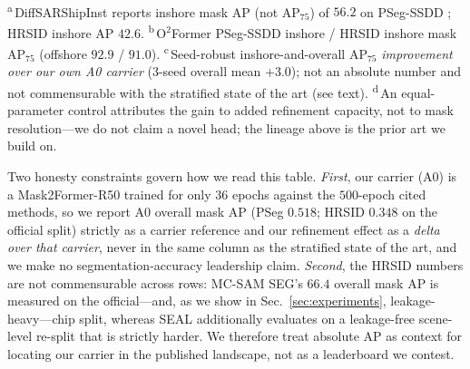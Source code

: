 \begin{table}[t]
\begin{tabular}{@{}llcccc@{}}
\bottomrule
\end{tabular}
\\[2pt]
\raggedright\footnotesize
\textsuperscript{a}\,DiffSARShipInst reports inshore mask AP (not AP$_{75}$) of $56.2$ on PSeg-SSDD \cite{xu2025diffsarshipinst}; HRSID inshore AP $42.6$.
\textsuperscript{b}\,O$^2$Former PSeg-SSDD inshore / HRSID inshore mask AP$_{75}$ \cite{gao2025o2former} (offshore $92.9$ / $91.0$).
\textsuperscript{c}\,Seed-robust inshore-and-overall AP$_{75}$ \emph{improvement over our own A0 carrier} (3-seed overall mean $+3.0$); not an absolute number and not commensurable with the stratified state of the art (see text).
\textsuperscript{d}\,An equal-parameter control attributes the gain to added refinement capacity, not to mask resolution---we do not claim a novel head; the lineage above is the prior art we build on.
\end{table}

Two honesty constraints govern how we read this table. \emph{First}, our carrier (A0) is a Mask2Former-R50 trained for only $36$ epochs against the $500$-epoch cited methods, so we report A0 overall mask AP (PSeg $0.518$; HRSID $0.348$ on the official split) strictly as a carrier reference and our refinement effect as a \emph{delta over that carrier}, never in the same column as the stratified state of the art, and we make no segmentation-accuracy leadership claim. \emph{Second}, the HRSID numbers are not commensurable across rows: MC-SAM SEG's $66.4$ overall mask AP \cite{zheng2024mcsamseg} is measured on the official---and, as we show in Sec.~\ref{sec:experiments}, leakage-heavy---chip split, whereas SEAL additionally evaluates on a leakage-free scene-level re-split that is strictly harder. We therefore treat absolute AP as context for locating our carrier in the published landscape, not as a leaderboard we contest.


